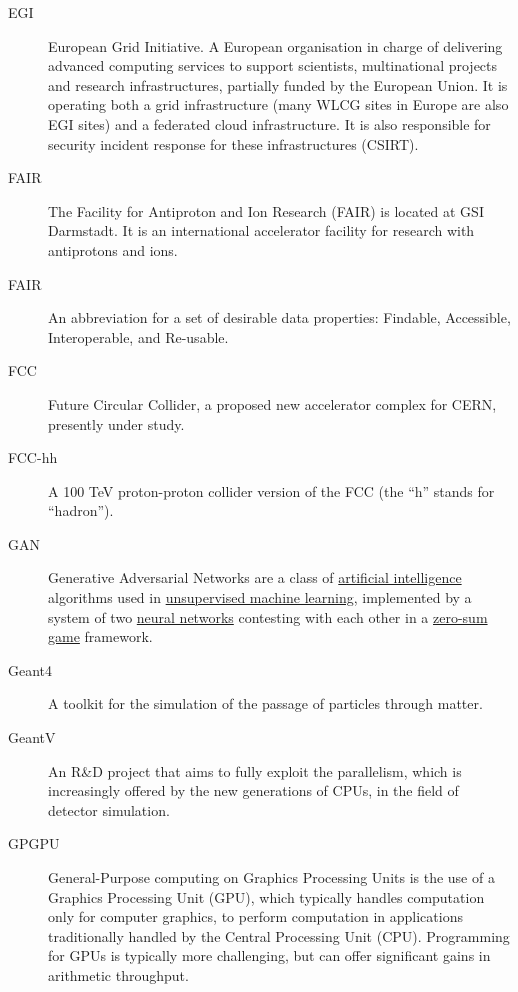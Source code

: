 \documentclass[twocolumn]{svjour3}          %
\begin{document}
\begin{appendices}
\begin{description}
\item[EGI] European Grid Initiative. A European organisation in charge of
delivering advanced computing services to support scientists,
multinational projects and research infrastructures, partially funded by
the European Union. It is operating both a grid infrastructure (many
WLCG sites in Europe are also EGI sites) and a federated cloud
infrastructure. It is also responsible for security incident response
for these infrastructures (CSIRT).

\item[FAIR] The Facility for Antiproton and Ion Research (FAIR) is located at
GSI Darmstadt. It is an international accelerator facility for research
with antiprotons and ions.

\item[FAIR] An abbreviation for a set of desirable data properties: Findable,
Accessible, Interoperable, and Re-usable.

\item[FCC] Future Circular Collider, a proposed new accelerator complex for
CERN, presently under study.

\item[FCC-hh] A 100 TeV proton-proton collider version of the FCC (the ``h''
stands for ``hadron'').

\item[GAN] Generative Adversarial Networks are a class of
\href{https://en.wikipedia.org/wiki/Artificial_intelligence}{artificial
intelligence} algorithms used in
\href{https://en.wikipedia.org/wiki/Unsupervised_machine_learning}{unsupervised
machine learning}, implemented by a system of two
\href{https://en.wikipedia.org/wiki/Neural_network}{neural networks}
contesting with each other in a
\href{https://en.wikipedia.org/wiki/Zero-sum_game}{zero-sum game}
framework.

\item[Geant4] A toolkit for the simulation of the passage of
particles through matter.

\item[GeantV] An R\&D project that aims to fully exploit the
parallelism, which is increasingly offered by the new generations of CPUs, in the field of detector simulation.

\item[GPGPU] General-Purpose computing on Graphics Processing Units is the use of a Graphics Processing Unit (GPU), which typically handles computation only for computer graphics, to perform computation in applications traditionally handled by the Central Processing Unit (CPU). Programming for GPUs is typically more challenging, but can offer significant gains in arithmetic throughput.


\end{description}
\end{appendices}
\end{document}
